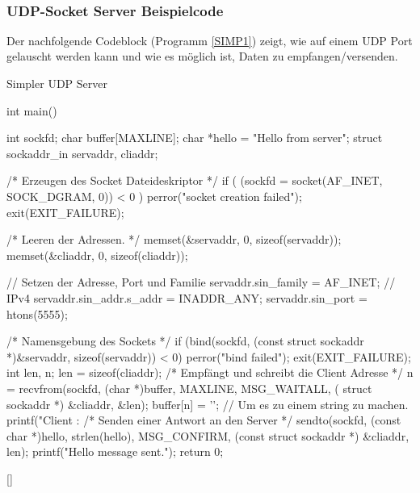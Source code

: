 \ \\%
\newpage
\subsubsection{UDP-Socket Server Beispielcode}
Der nachfolgende Codeblock (Programm \ref{SIMP1}) zeigt, wie auf einem UDP Port gelauscht werden kann und wie es möglich ist, Daten zu empfangen/versenden.
\begin{program}[H]
    \caption{Simpler UDP Server}
    \label{SIMP1}
    \begin{CppCode}
int main() {
    int sockfd;
    char buffer[MAXLINE];
    char *hello = "Hello from server";
    struct sockaddr_in servaddr, cliaddr;
    
    /* Erzeugen des Socket Dateideskriptor */
    if ( (sockfd = socket(AF_INET, SOCK_DGRAM, 0)) < 0 ) {
        perror("socket creation failed");
        exit(EXIT_FAILURE);
    }

    /* Leeren der Adressen. */
    memset(&servaddr, 0, sizeof(servaddr));
    memset(&cliaddr, 0, sizeof(cliaddr));

    // Setzen der Adresse, Port und Familie
    servaddr.sin_family = AF_INET; // IPv4
    servaddr.sin_addr.s_addr = INADDR_ANY;
    servaddr.sin_port = htons(5555); 

    /* Namensgebung des Sockets */
    if (bind(sockfd, (const struct sockaddr *)&servaddr, sizeof(servaddr)) < 0) {
        perror("bind failed");
        exit(EXIT_FAILURE);
    }
    int len, n;
    len = sizeof(cliaddr);
    /* Empfängt und schreibt die Client Adresse */
    n = recvfrom(sockfd, (char *)buffer, MAXLINE, MSG_WAITALL, ( struct sockaddr *) &cliaddr, &len);
    buffer[n] = '\0'; // Um es zu einem string zu machen.
    printf("Client : %
    /* Senden einer Antwort an den Server */
    sendto(sockfd, (const char *)hello, strlen(hello), MSG_CONFIRM, (const struct sockaddr *) &cliaddr, len);
    printf("Hello message sent.\n");
    return 0;
}
    \end{CppCode}[\cite{SRV14}]
\end{program}
\noindent
\newpage

